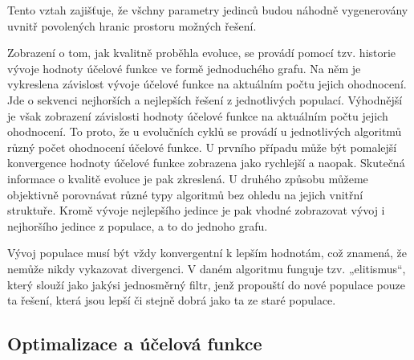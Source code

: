 \documentclass[bc,male,java,dept460]{diploma}		%
\begin{document}
\par Tento vztah zajišťuje, že všchny parametry jedinců budou náhodně vygenerovány uvnitř povolených hranic prostoru možných řešení.
\par Zobrazení o tom, jak kvalitně proběhla evoluce, se provádí pomocí tzv. historie vývoje hodnoty účelové funkce ve formě jednoduchého grafu. Na něm je vykreslena závislost vývoje účelové funkce na aktuálním počtu jejich ohodnocení. Jde o sekvenci nejhorších a nejlepších řešení z jednotlivých populací. Výhodnější je však zobrazení závislosti hodnoty účelové funkce na aktuálním počtu jejich ohodnocení. To proto, že u evolučních cyklů se provádí u jednotlivých algoritmů různý počet ohodnocení účelové funkce. U prvního případu může být pomalejší konvergence hodnoty účelové funkce zobrazena jako rychlejší a naopak. Skutečná informace o kvalitě evoluce je pak zkreslená. U druhého způsobu můžeme objektivně porovnávat různé typy algoritmů bez ohledu na jejich vnitřní struktuře.
Kromě vývoje nejlepšího jedince je pak vhodné zobrazovat vývoj i nejhoršího jedince z populace, a to do jednoho grafu.
\par Vývoj populace musí být vždy konvergentní k lepším hodnotám, což znamená, že nemůže nikdy vykazovat divergenci. V daném algoritmu funguje tzv. „elitismus“, který slouží jako jakýsi jednosměrný filtr, jenž propouští do nové populace pouze ta řešení, která jsou lepší či stejně dobrá jako ta ze staré populace.

\subsection{Optimalizace a účelová funkce}
\end{document}

